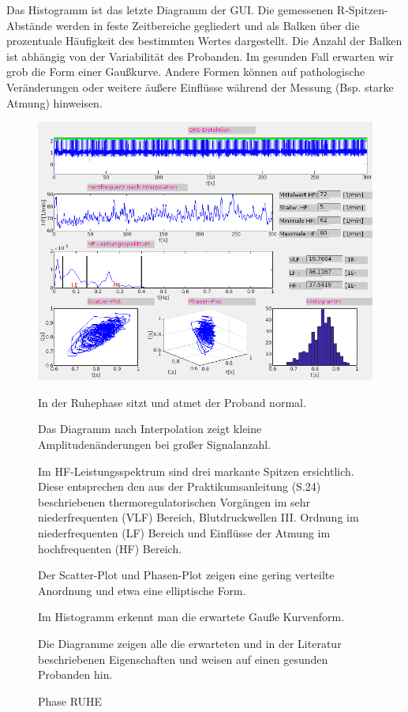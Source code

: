 \documentclass[a4paper,12pt,titlepage]{scrartcl}
\begin{document}
Das Histogramm ist das letzte Diagramm der GUI. Die gemessenen R-Spitzen-Abstände werden in feste Zeitbereiche gegliedert und als Balken über die prozentuale Häufigkeit des bestimmten Wertes dargestellt. Die Anzahl der Balken ist abhängig von der Variabilität des Probanden. Im gesunden Fall erwarten wir grob die Form einer Gaußkurve. Andere Formen können auf pathologische Veränderungen oder weitere äußere Einflüsse während der Messung (Bsp. starke Atmung) hinweisen.

\begin{figure}[ht]
    \begin{minipage}[t]{0.5\linewidth}
        \centering
        \includegraphics[width=0.9\linewidth, valign=t]{Assets/LaborBMT-16-59-32.png}
        \caption{Phase RUHE}
        \label{phaseruhe}
    \end{minipage}%
    \begin{minipage}[t]{0.5\linewidth}
        In der Ruhephase sitzt und atmet der Proband normal.

        Das Diagramm nach Interpolation zeigt kleine Amplitudenänderungen bei großer Signalanzahl.

        Im HF-Leistungsspektrum sind drei markante Spitzen ersichtlich. Diese entsprechen den aus der Praktikumsanleitung (S.24) beschriebenen thermoregulatorischen Vorgängen im sehr niederfrequenten (VLF) Bereich, Blutdruckwellen III. Ordnung im niederfrequenten (LF) Bereich und Einflüsse der Atmung im hochfrequenten (HF) Bereich.

        Der Scatter-Plot und Phasen-Plot zeigen eine gering verteilte Anordnung und etwa eine elliptische Form.

        Im Histogramm erkennt man die erwartete Gauße Kurvenform.

        Die Diagramme zeigen alle die erwarteten und in der Literatur beschriebenen Eigenschaften und weisen auf einen gesunden Probanden hin.

    \end{minipage}
\end{figure}
\end{document}
